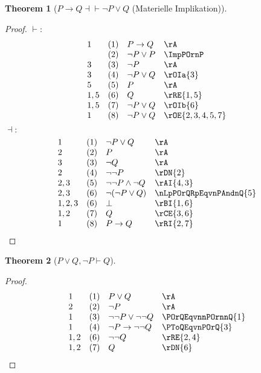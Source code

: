 \documentclass{book}
\theoremstyle{plain}
\newtheorem{theorem}{Theorem}
\theoremstyle{remark}
\theoremstyle{definition}
\begin{document}
\label{PToQEqvnPOrQ}
\begin{theorem}[\(P \rightarrow Q \dashv \vdash \neg P \lor Q\) (Materielle Implikation)]
\end{theorem}
\label{rule:MI}
\begin{proof}
	\(\vdash:\)
	\[
	\begin{array}{llll}
		1 & (1) & P \rightarrow Q & \rA \\
		& (2) & \neg P \lor P & \ImpPOrnP \\
		3 & (3) & \neg P & \rA \\
		3 & (4) & \neg P \lor Q & \rOIa{3} \\
		5 & (5) & P & \rA \\
		1,5 & (6) & Q & \rRE{1,5} \\
		1,5 & (7) & \neg P \lor Q & \rOIb{6} \\
		1 & (8) & \neg P \lor Q & \rOE{2,3,4,5,7}\\
	\end{array}
	\]
	\(\dashv:\)
	\[
	\begin{array}{llll}
		1 & (1) & \neg P \lor Q & \rA \\
		2 & (2) & P & \rA \\
		3 & (3) & \neg Q & \rA \\
		2 & (4) & \neg\neg P & \rDN{2} \\
		2,3 & (5) & \neg\neg P \land \neg Q & \rAI{4,3} \\
		2,3 & (6) & \neg(\neg P \lor Q) & \nLpPOrQRpEqvnPAndnQ{5} \\
		1,2,3 & (6) & \bot & \rBI{1,6} \\
		1,2 & (7) & Q & \rCE{3,6} \\
		1 & (8) & P \rightarrow Q & \rRI{2,7}\\
	\end{array}
	\]		
\end{proof}

\label{POrQwnPImpQ}
\begin{theorem}[\(P \lor Q,\neg P \vdash Q\)]
\end{theorem}
\begin{proof}
	\[
	\begin{array}{llll}
		1 & (1) & P \lor Q & \rA \\
	    2 & (2) & \neg P & \rA \\  
        1 & (3) & \neg\neg P\lor\neg\neg Q & \POrQEqvnnPOrnnQ{1} \\ 
        1 & (4) & \neg P \rightarrow \neg\neg Q & \PToQEqvnPOrQ{3} \\
        1,2 & (6) & \neg\neg Q & \rRE{2,4} \\
        1,2 & (7) & Q & \rDN{6} \\
	\end{array}
	\]
\end{proof}
\end{document}
